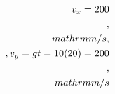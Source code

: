 \documentclass[preview]{standalone}
\begin{document}
\begin{align*}
\special{dvisvgm:raw <g id='unique000'>}v_x = 200\\,\\mathrm{m/s},\\, v_y = g t = 10(20) = 200\\,\\mathrm{m/s}\special{dvisvgm:raw </g>}
\end{align*}
\end{document}
